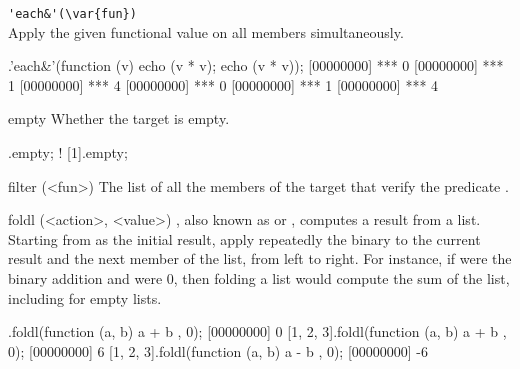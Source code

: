 \begin{urbiscriptapi}

\item \lstinline|'each&'(\var{fun})|\\
Apply the given functional value on all members simultaneously.

\begin{urbiscript}
[0, 1, 2].'each&'(function (v) {echo (v * v); echo (v * v)});
[00000000] *** 0
[00000000] *** 1
[00000000] *** 4
[00000000] *** 0
[00000000] *** 1
[00000000] *** 4
\end{urbiscript}

\item[empty]
  Whether the target is empty.

\begin{urbiassert}
[].empty;
! [1].empty;
\end{urbiassert}

\item[filter](<fun>)
  The list of all the members of the target that verify the predicate
  .


\item[foldl](<action>, <value>)
  ,
  also known as  or , computes a result
  from a list.  Starting from  as the initial result, apply
  repeatedly the binary  to the current result and the
  next member of the list, from left to right.  For instance, if
   were the binary addition and  were 0, then
  folding a list would compute the sum of the list, including for
  empty lists.

\begin{urbiscript}
[].foldl(function (a, b) { a + b }, 0);
[00000000] 0
[1, 2, 3].foldl(function (a, b) { a + b }, 0);
[00000000] 6
[1, 2, 3].foldl(function (a, b) { a - b }, 0);
[00000000] -6
\end{urbiscript}


\end{urbiscriptapi}

